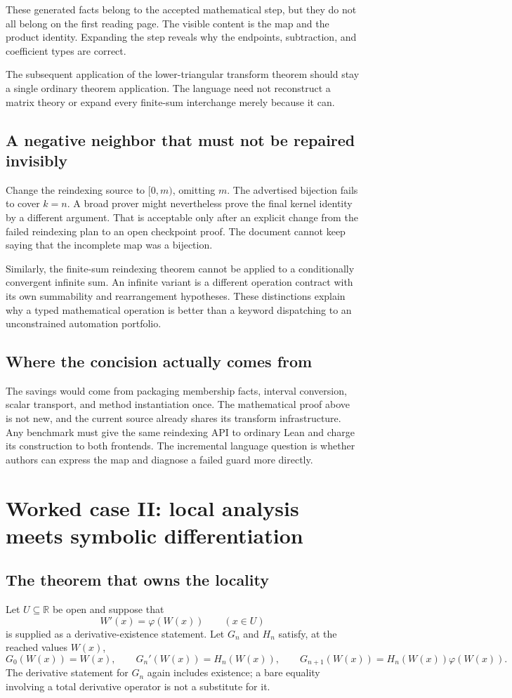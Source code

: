 \documentclass[11pt,a4paper]{article}
\newcommand{\R}{\mathbb R}
\theoremstyle{definition}
\theoremstyle{remark}
\begin{document}
These generated facts belong to the accepted mathematical step, but they do not all belong on the first reading page. The visible content is the map and the product identity. Expanding the step reveals why the endpoints, subtraction, and coefficient types are correct.

The subsequent application of the lower-triangular transform theorem should stay a single ordinary theorem application. The language need not reconstruct a matrix theory or expand every finite-sum interchange merely because it can.

\subsection{A negative neighbor that must not be repaired invisibly}
Change the reindexing source to $[0,m)$, omitting $m$. The advertised bijection fails to cover $k=n$. A broad prover might nevertheless prove the final kernel identity by a different argument. That is acceptable only after an explicit change from the failed reindexing plan to an open checkpoint proof. The document cannot keep saying that the incomplete map was a bijection.

Similarly, the finite-sum reindexing theorem cannot be applied to a conditionally convergent infinite sum. An infinite variant is a different operation contract with its own summability and rearrangement hypotheses. These distinctions explain why a typed mathematical operation is better than a keyword dispatching to an unconstrained automation portfolio.

\subsection{Where the concision actually comes from}
The savings would come from packaging membership facts, interval conversion, scalar transport, and method instantiation once. The mathematical proof above is not new, and the current source already shares its transform infrastructure. Any benchmark must give the same reindexing API to ordinary Lean and charge its construction to both frontends. The incremental language question is whether authors can express the map and diagnose a failed guard more directly.

\section{Worked case II: local analysis meets symbolic differentiation}\label{sec:lambert}
\subsection{The theorem that owns the locality}
Let $U\subseteq\R$ be open and suppose that
\[
W'(x)=\varphi(W(x))\qquad(x\in U)
\]
is supplied as a derivative-existence statement. Let $G_n$ and $H_n$ satisfy, at the reached values $W(x)$,
\[
G_0(W(x))=W(x),\qquad G_n'(W(x))=H_n(W(x)),
\qquad G_{n+1}(W(x))=H_n(W(x))\varphi(W(x)).
\]
The derivative statement for $G_n$ again includes existence; a bare equality involving a total derivative operator is not a substitute for it.
\end{document}
